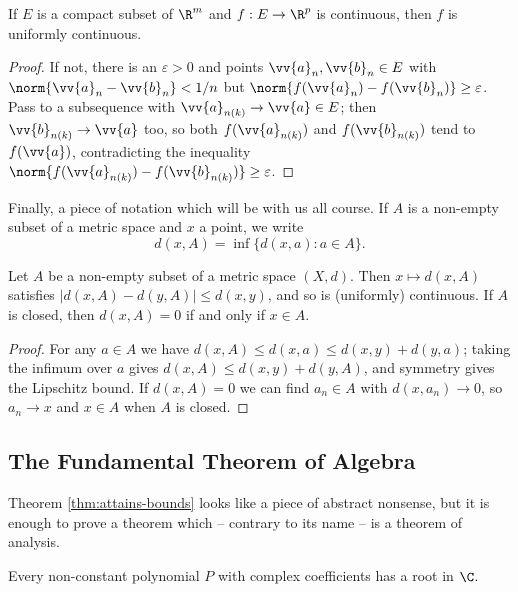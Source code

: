 \begin{theorem}\label{thm:unif-cts}
	If $E$ is a compact subset of $\R^m$ and $f : E \to \R^p$ is continuous, then $f$ is uniformly continuous.
\end{theorem}

\begin{proof}
	If not, there is an $\varepsilon > 0$ and points $\vv{a}_n, \vv{b}_n \in E$ with $\norm{\vv{a}_n - \vv{b}_n} < 1/n$ but $\norm{f(\vv{a}_n)-f(\vv{b}_n)} \geq \varepsilon$. Pass to a subsequence with $\vv{a}_{n(k)} \to \vv{a} \in E$; then $\vv{b}_{n(k)} \to \vv{a}$ too, so both $f(\vv{a}_{n(k)})$ and $f(\vv{b}_{n(k)})$ tend to $f(\vv{a})$, contradicting the inequality $\norm{f(\vv{a}_{n(k)})-f(\vv{b}_{n(k)})} \geq \varepsilon$.
\end{proof}

Finally, a piece of notation which will be with us all course. If $A$ is a non-empty subset of a metric space and $x$ a point, we write
$$d(x,A) = \inf\{d(x,a) : a \in A\}.$$

\begin{lemma}\label{lem:dist-cts}
	Let $A$ be a non-empty subset of a metric space $(X,d)$. Then $x \mapsto d(x,A)$ satisfies $|d(x,A)-d(y,A)| \leq d(x,y)$, and so is (uniformly) continuous. If $A$ is closed, then $d(x,A) = 0$ if and only if $x \in A$.
\end{lemma}

\begin{proof}
	For any $a \in A$ we have $d(x,A) \leq d(x,a) \leq d(x,y)+d(y,a)$; taking the infimum over $a$ gives $d(x,A) \leq d(x,y) + d(y,A)$, and symmetry gives the Lipschitz bound. If $d(x,A)=0$ we can find $a_n \in A$ with $d(x,a_n) \to 0$, so $a_n \to x$ and $x \in A$ when $A$ is closed.
\end{proof}

\subsection{The Fundamental Theorem of Algebra}

Theorem \ref{thm:attains-bounds} looks like a piece of abstract nonsense, but it is enough to prove a theorem which -- contrary to its name -- is a theorem of analysis.

\begin{theorem}\label{thm:fta}
	Every non-constant polynomial $P$ with complex coefficients has a root in $\C$.
\end{theorem}

